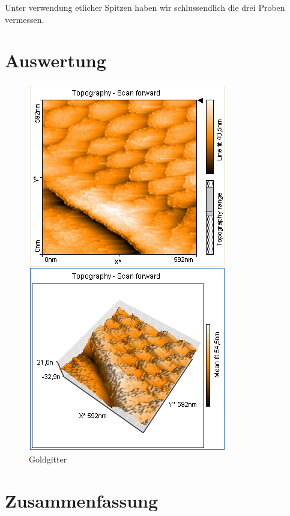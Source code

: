 \documentclass[12pt]{article}
\begin{document}
Unter verwendung etlicher Spitzen haben wir schlussendlich die drei Proben vermessen.
\section{Auswertung}
\begin{figure}[H]
\centering
\includegraphics[width=0.9\linewidth]{../plot/data/goldgitter/goldgitter.PNG}
\caption{Goldgitter}
\end{figure}
\section{Zusammenfassung}
\end{document}
